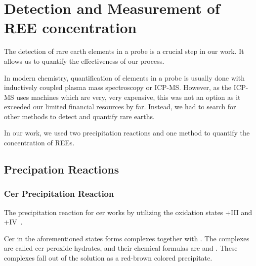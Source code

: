 \chapter{Detection and Measurement of REE concentration\authorA{}}


The detection of rare earth elements in a probe is a crucial step in our work.
It allows us to quantify the effectiveness of our process.

In modern chemistry,
quantification of elements in a probe is usually done with inductively coupled plasma mass spectroscopy or ICP-MS\@.
However, as the ICP-MS uses machines which are very, very expensive,
this was not an option as it exceeded our limited financial resources by far.
Instead, we had to search for other methods to detect and quantify rare earths.

In our work, we used two precipitation reactions and one method to quantify the concentration of REEs.


\section{Precipation Reactions}

\subsection{Cer Precipitation Reaction}
The precipitation reaction for cer works by utilizing the oxidation states +III and +IV~\cite{cerdetection,janderblasius}.

Cer in the aforementioned states forms complexes together with .
The complexes are called cer peroxide hydrates, and their chemical formulas are  and .
These complexes fall out of the solution as a red-brown colored precipitate.

